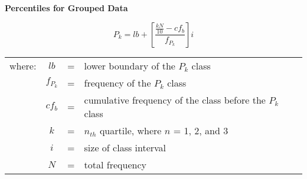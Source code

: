 \begin{center}
\textbf{Percentiles for Grouped Data}
\end{center}

\vspace*{1ex}


\[
P_k=lb + \left[\displaystyle \frac{\displaystyle \frac{kN}{10} - cf_b}{f_{P_k}} \right]i
\] 


\begin{center}
\begin{tabular}{lcll}
where: & $lb$ & = & lower boundary of the $P_k$ class \\
 & $f_{P_k} $& = & frequency of the $P_k$ class \\
& $cf_b$ & = & \makecell[tl]{cumulative frequency of the  class \\ before  the $P_k$ class} \\ 
& $k $ & = & $n_{th} $ quartile, where $n$ = 1, 2, and 3 \\ 
& $i$ & = & size of class interval\\ 
& $N$ & = & total frequency \\ 
\end{tabular} 
\end{center}